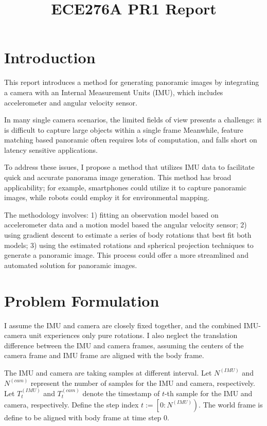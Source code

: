\documentclass[conference]{IEEEtran}
\begin{document}
\title{ECE276A PR1 Report}

\author{
}

\maketitle


\section{Introduction}
This report introduces a method for generating panoramic images by integrating 
a camera with an Internal Measurement Units (IMU), which includes 
accelerometer and angular velocity sensor.

In many single camera scenarios, the limited fields of view presents a challenge:
it is difficult to capture large objects within a single frame
Meanwhile, feature matching based panoramic often requires lots of computation, 
and falls short on latency sensitive applications.

To address these issues, I propose a method that utilizes IMU data to facilitate quick and 
accurate panorama image generation.
This method has broad applicability; for example, 
smartphones could utilize it to capture panoramic images, 
while robots could employ it for environmental mapping. 

The methodology involves: 1) fitting an observation model based on accelerometer data 
and a motion model based the angular velocity sensor;
2) using gradient descent to estimate a series of body rotations that 
best fit both models; 3) using the estimated rotations and 
spherical projection techniques to generate a panoramic image. 
This process could offer a more streamlined and automated solution for panoramic images.


\section{Problem Formulation}
I assume the IMU and camera are closely fixed together, 
and the combined IMU-camera unit experiences only pure rotations. 
I also neglect the translation difference between the IMU and camera frames, 
assuming the centers of the camera frame and IMU frame are aligned with the body frame.

The IMU and camera are taking samples at different interval.
Let $N^{(IMU)}$ and  $N^{(cam)} $ represent the number of samples for the IMU and camera, respectively.
Let $T^{(IMU)}_{t} $ and $T^{(cam)}_{t}$ denote the timestamp of $t$-th sample for the IMU and camera, respectively.
Define the step index $t := \left[0:N^{(IMU)}\right)$. 
The world frame is define to be aligned with body frame at time step 0.
\end{document}
